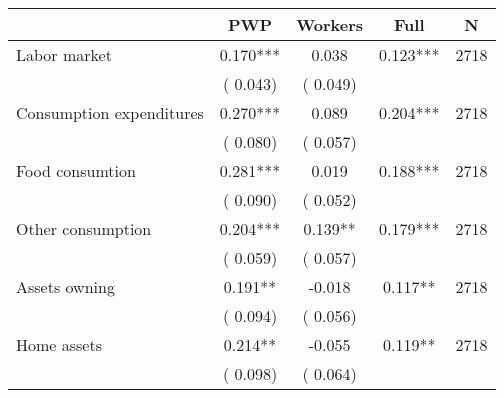 
\begin{tabular}{l*{4}{c}}\hline&\multicolumn{1}{c}{PWP}&\multicolumn{1}{c}{Workers}&\multicolumn{1}{c}{Full}&\multicolumn{1}{c}{N} \\ \hline

 Labor market &              0.170*** &         0.038 &           0.123*** & 2718                       \\  
                 &        (       0.043)                   &        (       0.049)                        &                                                             &                                                      \\      

 Consumption expenditures &              0.270*** &         0.089 &           0.204*** & 2718                       \\  
                 &        (       0.080)                   &        (       0.057)                        &                                                             &                                                      \\      

 Food consumtion &              0.281*** &         0.019 &           0.188*** & 2718                       \\  
                 &        (       0.090)                   &        (       0.052)                        &                                                             &                                                      \\      

 Other consumption &              0.204*** &         0.139** &           0.179*** & 2718                       \\  
                 &        (       0.059)                   &        (       0.057)                        &                                                             &                                                      \\      

 Assets owning &              0.191** &        -0.018 &           0.117** & 2718                       \\  
                 &        (       0.094)                   &        (       0.056)                        &                                                             &                                                      \\      

 Home assets &              0.214** &        -0.055 &           0.119** & 2718                       \\  
                 &        (       0.098)                   &        (       0.064)                        &                                                             &                                                      \\      


\end{tabular}
